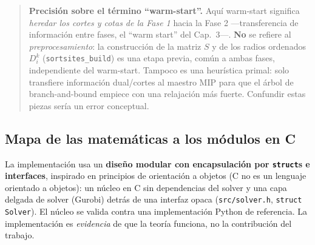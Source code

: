 \begin{quote}
\textbf{Precisión sobre el término ``warm-start''.} Aquí warm-start significa \emph{heredar los
cortes y cotas de la Fase 1} hacia la Fase 2 —transferencia de información entre fases, el
``warm start'' del Cap.~3—. \textbf{No} se refiere al \emph{preprocesamiento}: la construcción de
la matriz $S$ y de los radios ordenados $D^k_i$ (\texttt{sortsites\_build}) es una etapa previa,
común a ambas fases, independiente del warm-start. Tampoco es una heurística primal: solo
transfiere información dual/cortes al maestro MIP para que el árbol de branch-and-bound empiece
con una relajación más fuerte. Confundir estas piezas sería un error conceptual.
\end{quote}

\subsection{Mapa de las matemáticas a los módulos en C}
La implementación usa un \textbf{diseño modular con encapsulación por \texttt{struct}s e
interfaces}, inspirado en principios de orientación a objetos (C no es un lenguaje orientado a
objetos): un núcleo en C sin dependencias del solver y una capa delgada de solver (Gurobi) detrás
de una interfaz opaca (\texttt{src/solver.h}, \texttt{struct Solver}). El núcleo se valida contra
una implementación Python de referencia. La implementación es \emph{evidencia} de que la teoría funciona, no la
contribución del trabajo.

